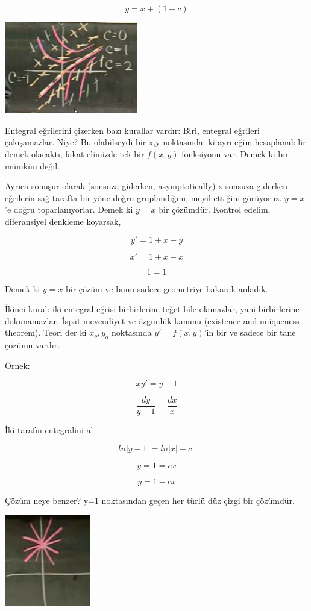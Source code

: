 \documentclass[12pt,fleqn]{article}\usepackage{../../common}
\begin{document}
$$y = x+(1-c)$$

\includegraphics[height=4cm]{./1_4.png}

Entegral eğrilerini çizerken bazı kurallar vardır: Biri, entegral eğrileri
çakışamazlar. Niye? Bu olabilseydi bir x,y noktasında iki ayrı eğim
hesaplanabilir demek olacaktı, fakat elimizde tek bir $f(x,y)$ fonksiyonu
var. Demek ki bu mümkün değil.

Ayrıca sonuşur olarak (sonsuza giderken, asymptotically) x sonsuza giderken
eğrilerin sağ tarafta bir yöne doğru gruplandığını, meyil ettiğini
görüyoruz. $y=x$'e doğru toparlanıyorlar. Demek ki $y=x$ bir
çözümdür. Kontrol edelim, diferansiyel denkleme koyarsak,

$$y' = 1+x-y$$

$$x' = 1+x-x$$

$$1 = 1$$

Demek ki $y=x$ bir çözüm ve bunu sadece geometriye bakarak anladık.

İkinci kural: iki entegral eğrisi birbirlerine teğet bile olamazlar, yani
birbirlerine dokunamazlar. İspat mevcudiyet ve özgünlük kanunu (existence and
uniqueness theorem). Teori der ki $x_o, y_o$ noktasında $y'=f(x,y)$'in bir ve
sadece bir tane çözümü vardır. 

Örnek: 

$$xy' = y - 1 $$

$$ \frac{dy}{y-1} = \frac{dx}{x} $$

İki tarafın entegralini al

$$ln|y-1| = ln|x| + c_1$$

$$y=1 = cx$$

$$y = 1-cx$$


Çözüm neye benzer? y=1 noktasından geçen her türlü düz çizgi bir çözümdür. 

\includegraphics[height=4cm]{1_5.png}
\end{document}
